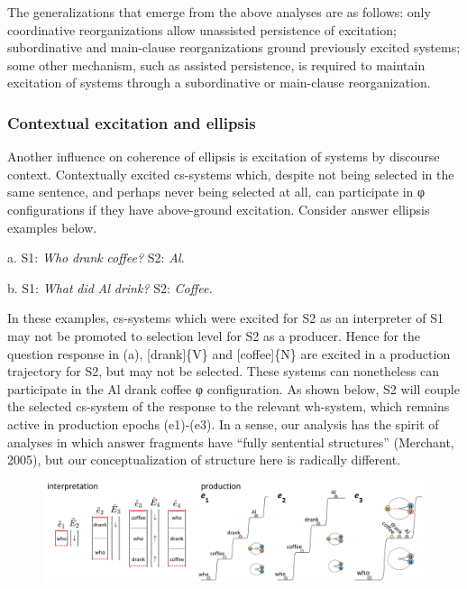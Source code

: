   The generalizations that emerge from the above analyses are as follows: only coordinative reorganizations allow unassisted persistence of excitation; subordinative and main-clause reorganizations ground previously excited systems; some other mechanism, such as assisted persistence, is required to maintain excitation of systems through a subordinative or main-clause reorganization. 

\subsubsection{Contextual excitation and ellipsis}

Another influence on coherence of ellipsis is excitation of systems by discourse context. Contextually excited cs-systems which, despite not being selected in the same sentence, and perhaps never being selected at all, can participate in φ configurations if they have above-ground excitation. Consider answer ellipsis examples below.

    a.    S1: \textit{Who} \textit{drank} \textit{coffee?}  S2: \textit{Al}.

     b.    S1: \textit{What} \textit{did} \textit{Al} \textit{drink?}   S2: \textit{Coffee.}

  In these examples, cs-systems which were excited for S2 as an interpreter of S1 may not be promoted to selection level for S2 as a producer. Hence for the question response in (a), [drank]\{V\} and [coffee]\{N\} are excited in a production trajectory for S2, but may not be selected. These systems can nonetheless can participate in the {\textbar}Al drank coffee{\textbar} φ configuration. As shown below, S2 will couple the selected cs-system of the response to the relevant wh-system, which remains active in production epochs (e1)-(e3). In a sense, our analysis has the spirit of analyses in which answer fragments have “fully sentential structures”  (Merchant, 2005), but our conceptualization of structure here is radically different.

  
\begin{figure}
\includegraphics[width=\textwidth]{figures/Tilsen-img151.png}
\caption{\missingcaption}
\label{fig:}
\end{figure}
 

